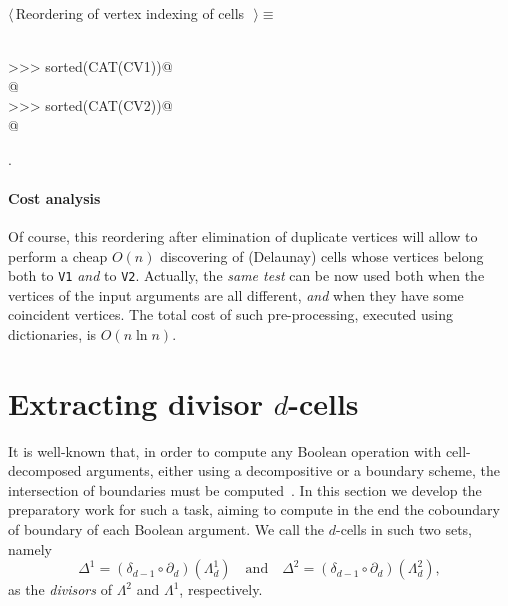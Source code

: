 \documentclass[11pt,oneside]{article}	%
\begin{document}
\begin{flushleft} \small \label{scrap11}
$\langle\,$Reordering of vertex indexing of cells\nobreak\ {\footnotesize {}}$\,\rangle\equiv$
\vspace{-1ex}
\begin{list}{}{} \item
\mbox{}\verb@@\\
\mbox{}\verb@>>> sorted(CAT(CV1))@\\
\mbox{}\verb@[0, 1, 1, 2, 3, 4, 5, 5]@\\
\mbox{}\verb@>>> sorted(CAT(CV2))@\\
\mbox{}\verb@[3, 4, 5, 6, 7, 7, 8, 8, 9, 10, 11]@\\
\mbox{}\verb@@{\NWsep}
\end{list}
\vspace{-1ex}
\footnotesize\addtolength{\baselineskip}{-1ex}
\begin{list}{}{\setlength{\itemsep}{-\parsep}\setlength{\itemindent}{-\leftmargin}}
\item {\NWtxtMacroNoRef}.
\end{list}
\end{flushleft}
\paragraph{Cost analysis} 
Of course, this reordering after elimination of duplicate vertices will allow to perform a cheap $O(n)$ discovering of (Delaunay) cells whose vertices belong both to \texttt{V1} \emph{and} to \texttt{V2}. 
Actually, the \emph{same test} can be now used both when the vertices of the input arguments are all different, \emph{and} when they have some coincident vertices.
The total cost of such pre-processing, executed using dictionaries, is $O(n\ln n)$.


\section{Extracting divisor $d$-cells}

It is well-known that, in order to compute any Boolean operation with cell-decomposed arguments, either using a decompositive or a boundary scheme, the intersection of boundaries must be computed~\cite{Paoluzzi:1989:BAO:70248.70249}. In this section we develop the preparatory work for such a task, aiming to compute in the end the coboundary of boundary of each Boolean argument. We call the $d$-cells in such two sets, namely
\[
\Delta^1 = (\delta_{d-1}\circ\partial_d)(\Lambda^1_d)
\quad\mbox{and}\quad
\Delta^2 = (\delta_{d-1}\circ\partial_d)(\Lambda^2_d),
\]
as the \emph{divisors} of $\Lambda^2$ and $\Lambda^1$, respectively.
\end{document}
